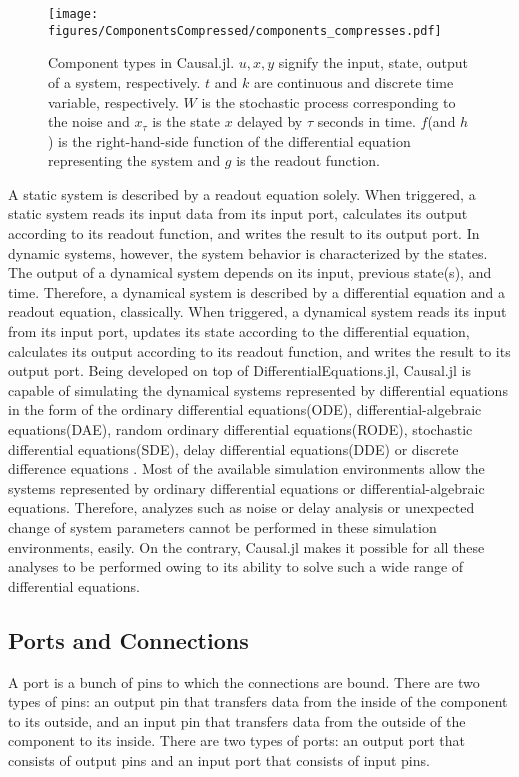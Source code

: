 \documentclass{juliacon}
\begin{document}
\begin{figure}
    \centering
    \texttt{[image: figures/ComponentsCompressed/components\_compresses.pdf]}
    \caption{Component types in Causal.jl. $u, x, y$ signify the input, state, output of a system, respectively. $t$ and $k$ are continuous and discrete time variable, respectively. $W$ is the stochastic process corresponding to the noise and $x_\tau$ is the state $x$ delayed by $\tau$ seconds in time. $f$(and $h$) is the right-hand-side function of the differential equation representing the system and $g$ is the readout function.}
    \label{fig: component types}
\end{figure}

A static system is described by a readout equation solely. When triggered, a static system reads its input data from its input port, calculates its output according to its readout function, and writes the result to its output port. In dynamic systems, however, the system behavior is characterized by the states. The output of a dynamical system depends on its input, previous state(s), and time. Therefore, a dynamical system is described by a differential equation and a readout equation, classically. When triggered, a dynamical system reads its input from its input port, updates its state according to the differential equation, calculates its output according to its readout function, and writes the result to its output port. Being developed on top of DifferentialEquations.jl, Causal.jl is capable of simulating the dynamical systems represented by differential equations in the form of the ordinary differential equations(ODE), differential-algebraic equations(DAE), random ordinary differential equations(RODE), stochastic differential equations(SDE), delay differential equations(DDE) or discrete difference equations \cite{rackauckas2017differentialequations}. Most of the available simulation environments allow the systems represented by ordinary differential equations or differential-algebraic equations\cite{elmqvist1978structured,nytsch2006advanced,zimmer2008introducing,mosterman2002hybrsim,van2001variables,giorgidze2009higher,pfeiffer2012pysimulator,simulink}. Therefore, analyzes such as noise or delay analysis or unexpected change of system parameters cannot be performed in these simulation environments, easily. On the contrary, Causal.jl makes it possible for all these analyses to be performed owing to its ability to solve such a wide range of differential equations.

\subsection{Ports and Connections}
A port is a bunch of pins to which the connections are bound. There are two types of pins: an output pin that transfers data from the inside of the component to its outside, and an input pin that transfers data from the outside of the component to its inside. There are two types of ports: an output port that consists of output pins and an input port that consists of input pins.
\end{document}
